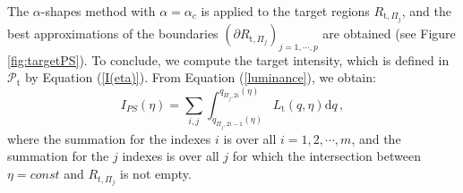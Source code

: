  \noindent The $\alpha$-shapes method with $\alpha = \alpha_{c}$ is applied to the target regions $R_{\textrm{t}, \Pi_j}$, and the
 best approximations of the boundaries
 $(\partial R_{\textrm{t}, \Pi_j})_{j = 1, \cdots, p}$ are obtained (see Figure \ref{fig:targetPS}).
\newline \indent To conclude, we compute the target intensity, which is defined in $\mathcal{P}_{\textrm{t}}$ by Equation (\ref{I(eta)}).
From Equation (\ref{luminance}), we obtain:
\begin{equation}
I_{PS}(\eta) = \sum_{ i, j }\int_{q_{\Pi_j,2i-1}( \eta)}^{q_{\Pi_j, 2i}( \eta)}L_\textrm{t}(q, \eta)\textrm{d}q\,,
\label{eq:Ips}
\end{equation}
where the summation for the indexes $i$ is over all $i = 1,2, \cdots, m$, and the summation for the $j$ indexes is over all $j$ for which the intersection between $\eta = const$ and $R_{t, \Pi_j}$ is not empty.






% 
\label{sec:Tir_alpha}

